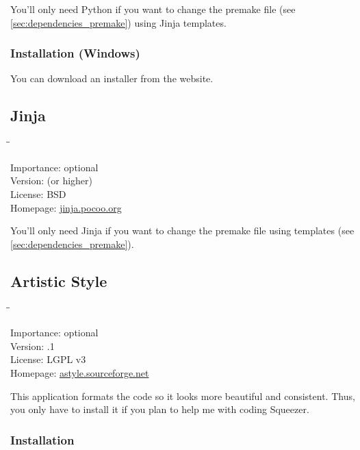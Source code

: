 You'll only need Python if you want to change the premake file (see
\ref{sec:dependencies_premake}) using Jinja templates.

\subsubsection{Installation (Windows)}

You can download an installer from the website.

\subsection{Jinja}

\begin{tabbing}
  \hspace*{6em}\=\=\kill

  Importance:  \> optional \\
  Version:      (or higher) \\
  License:     \> BSD \\
  Homepage:    \> \href{http://jinja.pocoo.org/}{jinja.pocoo.org}
\end{tabbing}

You'll only need Jinja if you want to change the premake file using
templates (see \ref{sec:dependencies_premake}).

\subsection{Artistic Style}

\begin{tabbing}
  \hspace*{6em}\=\=\kill

  Importance:  \> optional \\
  Version:     .1 \\
  License:     \> LGPL v3 \\
  Homepage:    \> \href{http://astyle.sourceforge.net/}{astyle.sourceforge.net}
\end{tabbing}

This application formats the code so it looks more beautiful and
consistent.  Thus, you only have to install it if you plan to help me
with coding Squeezer.

\subsubsection{Installation}

